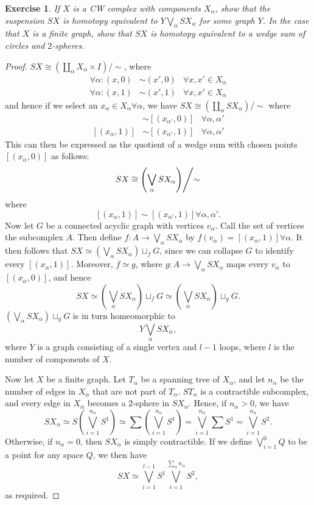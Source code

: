 \documentclass{article}
\newtheorem{exercise}[theorem]{Exercise}
\begin{document}
\begin{exercise}
If $X$ is a CW complex with components $X_\alpha$, show that the suspension $SX$ is homotopy equivalent to $Y\bigvee_\alpha SX_\alpha$ for some graph $Y$. In the case that $X$ is a finite graph, show that $SX$ is homotopy equivalent to a wedge sum of circles and $2$-spheres.
\end{exercise}
\begin{proof}
$SX\cong(\coprod_\alpha X_\alpha\times I)/\sim$, where\begin{align*}
\forall\alpha:(x,0)&\sim(x',0)&\forall x,x'\in X_\alpha\\\forall\alpha:(x,1)&\sim(x',1)&\forall x,x'\in X_\alpha
\end{align*} and hence if we select an $x_\alpha\in X_\alpha\forall\alpha$, we have $SX\cong(\coprod_\alpha SX_\alpha)/\sim$ where\begin{align*}
[(x_\alpha,0)]&\sim[(x_{\alpha'},0)]&\forall \alpha,\alpha'\\ [(x_\alpha,1)]&\sim[(x_{\alpha'},1)]&\forall \alpha,\alpha'
\end{align*} This can then be expressed as the quotient of a wedge sum with chosen points $[(x_\alpha,0)]$ as follows:\[\left.SX\cong\left(\bigvee_\alpha SX_\alpha\right)\middle/\sim\right.\] where\[[(x_\alpha,1)]\sim[(x_{\alpha'},1)]\forall \alpha,\alpha'.\]Now let $G$ be a connected acyclic graph with vertices $v_\alpha$. Call the set of vertices the subcomplex $A$. Then define $f:A\to \bigvee_\alpha SX_\alpha$ by $f(v_\alpha)=[(x_\alpha,1)]\forall\alpha$. It then follows that $SX\simeq\left(\bigvee_\alpha SX_\alpha\right)\sqcup_f G$, since we can collapse $G$ to identify every $[(x_\alpha,1)]$. Moreover, $f\simeq g$, where $g:A\to \bigvee_\alpha SX_\alpha$ maps every $v_\alpha$ to $[(x_\alpha,0)]$, and hence \[SX\simeq\left(\bigvee_\alpha SX_\alpha\right)\sqcup_f G\simeq\left(\bigvee_\alpha SX_\alpha\right)\sqcup_g G.\] $\left(\bigvee_\alpha SX_\alpha\right)\sqcup_g G$ is in turn homeomorphic to \[Y\bigvee_\alpha SX_\alpha,\] where $Y$ is a graph consisting of a single vertex and $l-1$ loops, where $l$ is the number of components of $X$.\newline

\noindent Now let $X$ be a finite graph. Let $T_\alpha$ be a spanning tree of $X_\alpha$, and let $n_\alpha$ be the number of edges in $X_\alpha$ that are not part of $T_\alpha$. $ST_\alpha$ is a contractible subcomplex, and every edge in $X_\alpha$ becomes a $2$-sphere in $SX_\alpha$. Hence, if $n_\alpha>0$, we have \[SX_\alpha\simeq S\left(\bigvee_{i=1}^{n_\alpha}S^1\right)\simeq\sum\left(\bigvee_{i=1}^{n_\alpha}S^1\right)=\bigvee_{i=1}^{n_\alpha}\sum S^1=\bigvee_{i=1}^{n_\alpha}S^2.\] Otherwise, if $n_\alpha=0$, then $SX_\alpha$ is simply contractible. If we define $\bigvee_{i=1}^0Q
$ to be a point for any space $Q$, we then have\[SX\simeq \bigvee_{i=1}^{l-1}S^1\bigvee_{i=1}^{\sum_\alpha n_\alpha}S^2,\] as required.
\end{proof}
\end{document}
